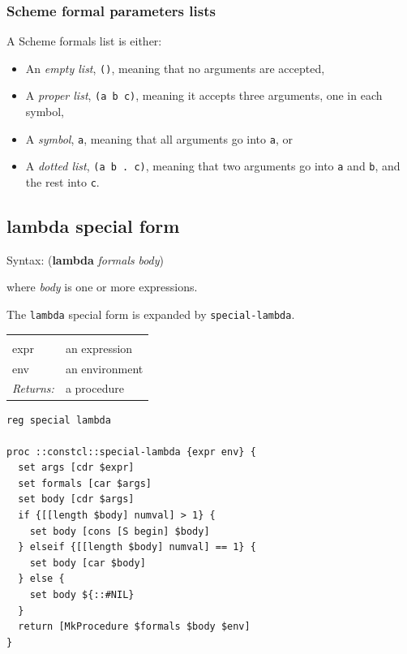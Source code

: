\documentclass[twoside]{report}
\begin{document}
\begin{pulledtext}

\subsubsection{Scheme formal parameters lists}
\label{scheme-formal-parameters-lists}

A Scheme formals list is either:

\begin{itemize}
\item An \emph{empty list}, \texttt{()}, meaning that no arguments are accepted,
\item A \emph{proper list}, \texttt{(a b c)}, meaning it accepts three arguments, one in each symbol,
\item A \emph{symbol}, \texttt{a}, meaning that all arguments go into \texttt{a}, or
\item A \emph{dotted list}, \texttt{(a b . c)}, meaning that two arguments go into \texttt{a} and \texttt{b}, and the rest into \texttt{c}.
\end{itemize}
\end{pulledtext}

\subsection{lambda special form}
\label{lambda-special-form}

Syntax: (\textbf{lambda} \emph{formals} \emph{body})

where \emph{body} is one or more expressions.

The \texttt{lambda} special form is expanded by \texttt{special-lambda}.

\noindent\begin{tabular}{ |p{1.9cm} p{8cm}| }
\hline
\rowcolor[HTML]{CCCCCC} \multicolumn{2}{|l|}{\bf special-lambda (internal)} \\
expr & an expression \\
env & an environment \\
\textit{Returns:} & a procedure \\
\hline
\end{tabular}

\begin{lstlisting}
reg special lambda

proc ::constcl::special-lambda {expr env} {
  set args [cdr $expr]
  set formals [car $args]
  set body [cdr $args]
  if {[[length $body] numval] > 1} {
    set body [cons [S begin] $body]
  } elseif {[[length $body] numval] == 1} {
    set body [car $body]
  } else {
    set body ${::#NIL}
  }
  return [MkProcedure $formals $body $env]
}
\end{lstlisting}
\end{document}
